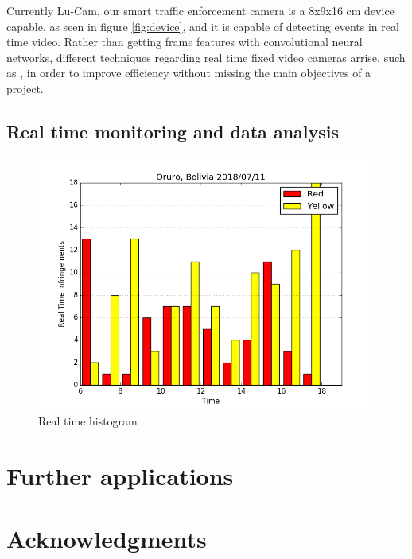 \documentclass[fleqn,12pt]{SelfArx} %
\begin{document}
Currently Lu-Cam, our smart traffic enforcement camera is a 8x9x16 cm device capable, as seen in figure \ref{fig:device}, and it is capable of detecting events in real time video. Rather than getting frame features with convolutional neural networks, different techniques regarding real time fixed video cameras arrise, such as \cite{Cavigelli:2017:CCI:3131885.3131906}, in order to improve efficiency without missing the main objectives of a project.

\subsection{Real time monitoring and data analysis}

\begin{figure}[ht]\centering
	\includegraphics[width=\linewidth]{images/histogram}
	\caption{Real time histogram}
	\label{fig:histogram}
\end{figure}



\section{Further applications}

\lipsum[15-23] %

\section*{Acknowledgments} %
\end{document}
